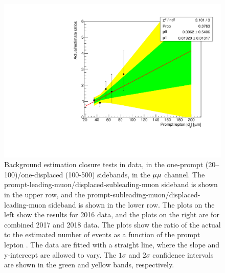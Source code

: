 \begin{figure}[hbtp]
\includegraphics[scale=0.35]{figures/bg/mumu_data_2017_2018_displacedLeading_ratiosVsPromptD0.pdf}
\caption{Background estimation closure tests in data, in the one-prompt (20--100\mum)/one-displaced (100-500\mum) sidebands, in the ${\mu}{\mu}$ channel. The prompt-leading-muon/displaced-subleading-muon sideband is shown in the upper row, and the prompt-subleading-muon/displaced-leading-muon sideband is shown in the lower row. The plots on the left show the results for 2016 data, and the plots on the right are for combined 2017 and 2018 data. The plots show the ratio of the actual to the estimated number of events as a function of the prompt lepton \ad. The data are fitted with a straight line, where the slope and y-intercept are allowed to vary. The $1\sigma$ and $2\sigma$ confidence intervals are shown in the green and yellow bands, respectively.}
\label{100to500um_fits_mumu}
\end{figure}
